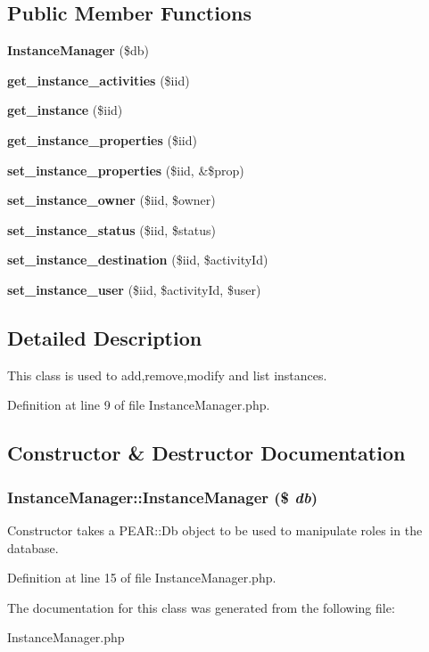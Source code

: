 \subsection*{Public Member Functions}
\begin{CompactItemize}
\item 
{\bf Instance\-Manager} (\$db)
\item 
{\bf get\_\-instance\_\-activities} (\$iid)\label{classInstanceManager_a1}

\item 
{\bf get\_\-instance} (\$iid)\label{classInstanceManager_a2}

\item 
{\bf get\_\-instance\_\-properties} (\$iid)\label{classInstanceManager_a3}

\item 
{\bf set\_\-instance\_\-properties} (\$iid, \&\$prop)\label{classInstanceManager_a4}

\item 
{\bf set\_\-instance\_\-owner} (\$iid, \$owner)\label{classInstanceManager_a5}

\item 
{\bf set\_\-instance\_\-status} (\$iid, \$status)\label{classInstanceManager_a6}

\item 
{\bf set\_\-instance\_\-destination} (\$iid, \$activity\-Id)\label{classInstanceManager_a7}

\item 
{\bf set\_\-instance\_\-user} (\$iid, \$activity\-Id, \$user)\label{classInstanceManager_a8}

\end{CompactItemize}


\subsection{Detailed Description}
This class is used to add,remove,modify and list instances. 



Definition at line 9 of file Instance\-Manager.php.

\subsection{Constructor \& Destructor Documentation}
\subsubsection{\setlength{\rightskip}{0pt plus 5cm}Instance\-Manager::Instance\-Manager (\$ {\em db})}\label{classInstanceManager_a0}


Constructor takes a PEAR::Db object to be used to manipulate roles in the database. 

Definition at line 15 of file Instance\-Manager.php.

The documentation for this class was generated from the following file:\begin{CompactItemize}
\item 
Instance\-Manager.php\end{CompactItemize}
